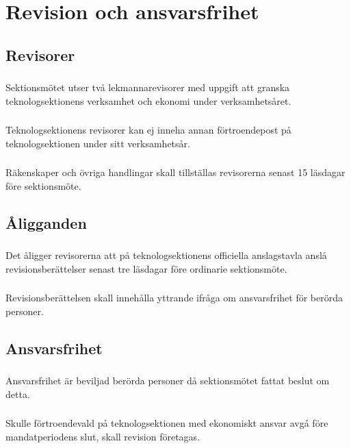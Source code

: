 \documentclass[a4paper, 10pt]{article}
\begin{document}
\section{Revision och ansvarsfrihet}
\subsection{Revisorer}
\subsubsection{}
Sektionsmötet utser två lekmannarevisorer med uppgift att granska teknologsektionens verksamhet och ekonomi under verksamhetsåret.
\subsubsection{}
Teknologsektionens revisorer kan ej inneha annan förtroendepost på teknologsektionen under sitt verksamhetsår.
\subsubsection{}
Räkenskaper och övriga handlingar skall tillställas revisorerna senast 15 läsdagar före sektionsmöte.
\subsection{Åligganden}
\subsubsection{}
Det åligger revisorerna att på teknologsektionens officiella anslagstavla anslå revisionsberättelser senast tre läsdagar före ordinarie sektionsmöte.
\subsubsection{}
Revisionsberättelsen skall innehålla yttrande ifråga om ansvarsfrihet för berörda personer.
\subsection{Ansvarsfrihet}
\subsubsection{}
Ansvarsfrihet är beviljad berörda personer då sektionsmötet fattat beslut om detta.
\subsubsection{}
Skulle förtroendevald på teknologsektionen med ekonomiskt ansvar avgå före mandatperiodens slut, skall revision företagas.
\newpage
\end{document}
